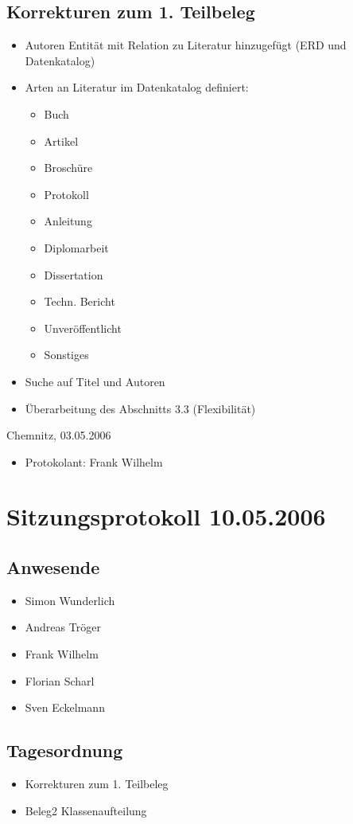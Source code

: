 			\subsection{Korrekturen zum 1. Teilbeleg}
			\begin{itemize}
				\item Autoren Entität mit Relation zu Literatur hinzugefügt (ERD und Datenkatalog)
				\item Arten an Literatur im Datenkatalog definiert:
					\begin{itemize}
						\item Buch
						\item Artikel
						\item Broschüre
						\item Protokoll
						\item Anleitung
						\item Diplomarbeit
						\item Dissertation
						\item Techn. Bericht
						\item Unveröffentlicht
						\item Sonstiges
					\end{itemize}
				\item Suche auf Titel und Autoren
				\item Überarbeitung des Abschnitts 3.3 (Flexibilität)
			\end{itemize}
			Chemnitz, 03.05.2006
			\begin{itemize}
				\item Protokolant: Frank Wilhelm
			\end{itemize}
\newpage
		\section{Sitzungsprotokoll 10.05.2006}
		\subsection{Anwesende}
		\begin{itemize}
			\item Simon Wunderlich
			\item Andreas Tröger
			\item Frank Wilhelm
			\item Florian Scharl
			\item Sven Eckelmann
		\end{itemize}
		\subsection{Tagesordnung}
		\begin{itemize}
			\item Korrekturen zum 1. Teilbeleg
			\item Beleg2 Klassenaufteilung
		\end{itemize}
